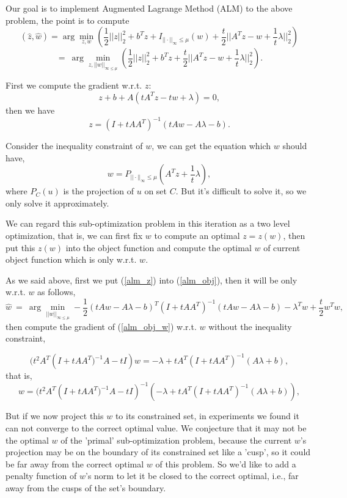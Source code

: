 \documentclass[]{article}
\begin{document}
Our goal is to implement Augmented Lagrange Method (ALM) to the above problem, the point is to compute
	$$(\hat{z}, \hat{w}) = \arg\min_{z,w}(\frac{1}{2}||z||_2^2+b^Tz + I_{||\cdot||_{\infty}\leq \mu}(w) + \frac{t}{2}||A^Tz-w+\frac{1}{t}\lambda||_2^2)$$
\begin{equation}\label{alm_obj}
	= \ \arg\min_{z, ||w||_{\infty\leq\mu}} (\frac{1}{2}||z||_2^2+b^Tz + \frac{t}{2}||A^Tz-w+\frac{1}{t}\lambda||_2^2).
\end{equation}
	
First we compute the gradient w.r.t. $z$:
$$z+b+A(tA^Tz-tw+\lambda) = 0,$$
then we have
\begin{equation}\label{alm_z}
	z = (I+tAA^T)^{-1}(tAw-A\lambda - b).
\end{equation}

Consider the inequality constraint of $w$, we can get the equation which $w$ should have,
\begin{equation}
	w = P_{||\cdot||_{\infty}\leq \mu}(A^Tz+\frac{1}{t}\lambda),
\end{equation}
where $P_C(u)$ is the projection of $u$ on set $C$. But it's difficult to solve it, so we only solve it approximately.

We can regard this sub-optimization problem in this iteration as a two level optimization, that is, we can first fix $w$ to compute an optimal $z=z(w)$, then put this $z(w)$ into the object function and compute the optimal $w$ of current object function which is only w.r.t. $w$.

As we said above, first we put (\ref{alm_z}) into (\ref{alm_obj}), then it will be only w.r.t. $w$ as follows,
\begin{equation}\label{alm_obj_w}
	\hat{w} \ = \ \arg\min_{||w||_{\infty\leq\mu}}-\frac{1}{2}(t A w-A \lambda-b)^{T}\left(I+t A A^{T}\right)^{-1}(t A w-A \lambda-b)-\lambda^{T} w+\frac{t}{2} w^{T} w,
\end{equation}
then compute the gradient of (\ref{alm_obj_w}) w.r.t. $w$ without the inequality constraint, 

$$(t^{2} A^{T}\left(I+t A A^{T})^{-1} A-t I\right) w=-\lambda+t A^{T}\left(I+t A A^{T}\right)^{-1}(A \lambda+b),$$
that is,
\begin{equation}
 w= (t^{2} A^{T}\left(I+t A A^{T})^{-1} A-t I\right)^{-1}(-\lambda+t A^{T}\left(I+t A A^{T}\right)^{-1}(A \lambda+b)),
\end{equation}

But if we now project this $w$ to its constrained set, in experiments we found it can not converge to the correct optimal value. We conjecture that it may not be the optimal $w$ of the 'primal' sub-optimization problem, because the current $w$'s projection may be on the boundary of its constrained set like a 'cusp', so it could be far away from the correct optimal $w$ of this problem. So we'd like to add a penalty function of $w$'s norm to let it be closed to the correct optimal, i.e., far away from the cusps of the set's boundary. 
\end{document}
